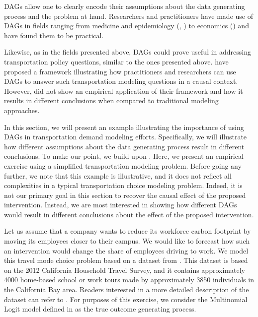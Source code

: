 DAGs allow one to clearly encode their assumptions about the data generating process and the problem at hand.
Researchers and practitioners have made use of DAGs in fields ranging from medicine and epidemiology (\citet{shrier_platt_2008}, \citet{sung_2011}) to economics (\citet{white2011causal}) and have found them to be practical.


Likewise, as in the fields presented above, DAGs could prove useful in addressing transportation policy questions, similar to the ones presented above.
\citet{brathwaite_2018_causal} have proposed a framework illustrating how practitioners and researchers can use DAGs
 to answer such transportation modeling questions in a causal context.
However, \citet{brathwaite_2018_causal} did not show an empirical application of their framework and how it results
 in different conclusions when compared to traditional modeling approaches.

In this section, we will present an example illustrating the importance of using DAGs in transportation demand modeling efforts.
Specifically, we will illustrate how different assumptions about the data generating process result in different conclusions.
To make our point, we build upon \citet{brathwaite_2018_causal}.
Here, we present an empirical exercise using a simplified transportation modeling problem.
Before going any further, we note that this example is illustrative, and it does not reflect all complexities in a typical transportation choice modeling problem.
Indeed, it is not our primary goal in this section to recover the causal effect of the proposed intervention.
Instead, we are most interested in showing how different DAGs would result in different conclusions about the effect of the proposed intervention.

Let us assume that a company wants to reduce its workforce carbon footprint by moving its employees closer to their campus.
We would like to forecast how such an intervention would change the share of employees driving to work.
We model this travel mode choice problem based on a dataset from \citet{brathwaite_asymmetric}.
This dataset is based on the 2012 California Household Travel Survey, and it
contains approximately 4000 home-based school or work tours made by approximately 3850 individuals in the California Bay area.
Readers interested in a more detailed description of the dataset can refer to \citet{brathwaite_asymmetric}.
For purposes of this exercise, we consider the Multinomial Logit model defined in \citet{brathwaite_asymmetric} as the true outcome generating process.

